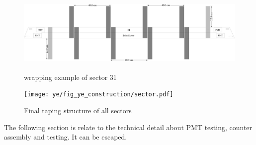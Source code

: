 \begin{figure}[h!]
\centerline{\includegraphics[width=18cm,height=4cm]{ye/fig_ye_construction/sector-31-wraping.pdf}}
\caption{wrapping example of sector 31 }
\label{f:sector31}
\end{figure}
\newpage
\begin{figure}[h!]
\centerline{\texttt{[image: ye/fig\_ye\_construction/sector.pdf]}}
\caption{Final taping structure of all sectors }
\label{f:allsector}
\end{figure}
\newpage


The following section is relate to the technical detail about PMT testing, counter assembly and testing. It can be escaped.
